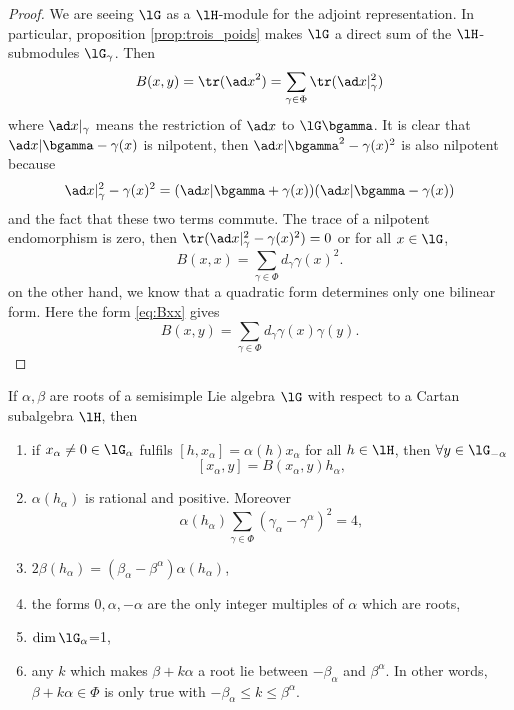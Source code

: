 \begin{proof}
    We are seeing $\lG$ as a $\lH$-module for the adjoint representation. In particular, proposition \ref{prop:trois_poids} makes $\lG$ a direct sum of the $\lH$-submodules $\lG_{\gamma}$. Then
    \begin{equation}
    B(x,y)=\tr({\ad x}^2)\\
            =\sum_{\gamma\in\Phi}\tr(\ad x|_{\gamma}^2)
    \end{equation}
    where $\ad x|_{\gamma}$ means the restriction of $\ad x$ to $\lG\bgamma$. It is clear that $\ad x|\bgamma-\gamma(x)$ is nilpotent, then $\ad x|\bgamma^2-\gamma(x)^2$ is also nilpotent because
    \[
    \ad x|_{\gamma}^2-\gamma(x)^2=(\ad x|\bgamma+\gamma(x))(\ad x|\bgamma-\gamma(x))
    \]
    and the fact that these two terms commute. The trace of a nilpotent endomorphism is zero, then $\tr(\ad x|_{\gamma}^2-\gamma(x)^2)=0$ or for all $x\in\lG$,
    \begin{equation}\label{eq:Bxx}
    B(x,x)=\sum_{\gamma\in\Phi}d_{\gamma}\gamma(x)^2.
    \end{equation}
    on the other hand, we know that a quadratic form determines only one bilinear form. Here the form \eqref{eq:Bxx} gives
    \[
    B(x,y)=\sum_{\gamma\in\Phi}d_{\gamma}\gamma(x)\gamma(y).
    \]
\end{proof}

\begin{theorem}\label{tho:six_Cartan}
    If $\alpha,\beta$ are roots of a semisimple Lie algebra $\lG$ with respect to a Cartan subalgebra $\lH$, then
    \begin{enumerate}
        \item if $x_{\alpha}\neq0\in\lG_{\alpha}$ fulfils $[h,x_{\alpha}]=\alpha(h)x_{\alpha}$ for all $h\in\lH$, then $\forall y\in\lG_{-\alpha}$
        \[
        [x_{\alpha},y]=B(x_{\alpha},y)h_{\alpha},
        \] 
        \item\label{ite:six_deux} $\alpha(h_{\alpha})$ is rational and positive. Moreover 
        \[
        \alpha(h_{\alpha})\sum_{\gamma\in\Phi}(\gamma_{\alpha}-\gamma^{\alpha})^2=4,
        \]
        \item $2\beta(h_{\alpha})=(\beta_{\alpha}-\beta^{\alpha})\alpha(h_{\alpha})$,
        \label{ite:six_trois}
        \item the forms $0,\alpha,-\alpha$ are the only integer multiples of $\alpha$ which are roots,
        \label{ite:six_quatre}
        \item $\dim\lG_{\alpha}$=1,
        \label{ite:six_cinq}
        \item any $k$ which makes $\beta+k\alpha$ a root lie between $-\beta_{\alpha}$ and $\beta^{\alpha}$. In other words, $\beta+k\alpha\in\Phi$ is only true with $-\beta_{\alpha}\leq k\leq\beta^{\alpha}$.
        \label{ite:six_six}
    \end{enumerate}

\end{theorem}

